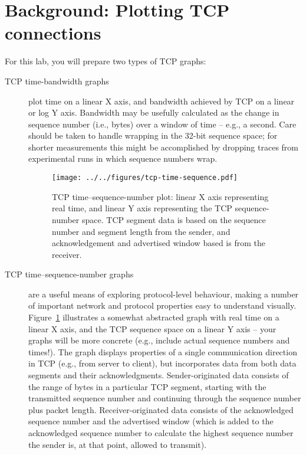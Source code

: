 \documentclass[a4paper,10pt]{article}
\begin{document}
\section*{Background: Plotting TCP connections}

For this lab, you will prepare two types of TCP graphs:

\begin{description}
\item[TCP time-bandwidth graphs] plot time on a linear X axis, and bandwidth
  achieved by TCP on a linear or log Y axis.
  Bandwidth may be usefully calculated as the change in sequence number (i.e.,
  bytes) over a window of time -- e.g., a second.
  Care should be taken to handle wrapping in the 32-bit sequence space; for
  shorter measurements this might be accomplished by dropping traces from
  experimental runs in which sequence numbers wrap.

\begin{figure}[t]
\begin{center}
  \texttt{[image: ../../figures/tcp-time-sequence.pdf]}
\end{center}
\caption{TCP time--sequence-number plot: linear X axis representing real time,
and linear Y axis representing the TCP sequence-number space.
TCP segment data is based on the sequence number and segment length from the
sender, and acknowledgement and advertised window based is from the receiver.}
\label{fig:tcp-time-sequence-number-graph}
\end{figure}

\item[TCP time--sequence-number graphs] are a useful means of exploring
  protocol-level behaviour, making a number of important network and protocol
  properties easy to understand visually.
  Figure~\ref{fig:tcp-time-sequence-number-graph} illustrates a somewhat
  abstracted graph with real time on a linear X axis, and the TCP sequence
  space on a linear Y axis -- your graphs will be more concrete (e.g., include
  actual sequence numbers and times!).
  The graph displays properties of a single communication direction in TCP
  (e.g., from server to client), but incorporates data from both data segments
  and their acknowledgments.
  Sender-originated data consists of the range of bytes in a particular TCP
  segment, starting with the transmitted sequence number and continuing
  through the sequence number plus packet length.
  Receiver-originated data consists of the acknowledged sequence number and
  the advertised window (which is added to the acknowledged sequence number
  to calculate the highest sequence number the sender is, at that point,
  allowed to transmit).
\end{description}
\end{document}
